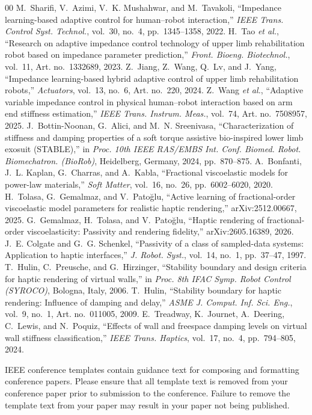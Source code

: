 ﻿\documentclass[conference]{IEEEtran}
\begin{document}
\begin{thebibliography}{00}
M.~Sharifi, V.~Azimi, V.~K. Mushahwar, and M.~Tavakoli, ``Impedance
learning-based adaptive control for human--robot interaction,'' \emph{IEEE
Trans. Control Syst. Technol.}, vol.~30, no.~4, pp.~1345--1358, 2022.
H.~Tao \emph{et al.}, ``Research on adaptive impedance control technology of
upper limb rehabilitation robot based on impedance parameter prediction,''
\emph{Front. Bioeng. Biotechnol.}, vol.~11, Art. no.~1332689, 2023.
Z.~Jiang, Z.~Wang, Q.~Lv, and J.~Yang, ``Impedance learning-based hybrid
adaptive control of upper limb rehabilitation robots,'' \emph{Actuators},
vol.~13, no.~6, Art. no.~220, 2024.
Z.~Wang \emph{et al.}, ``Adaptive variable impedance control in physical
human--robot interaction based on arm end stiffness estimation,'' \emph{IEEE
Trans. Instrum. Meas.}, vol.~74, Art. no.~7508957, 2025.
J.~Bottin-Noonan, G.~Alici, and M.~N. Sreenivasa, ``Characterization of
stiffness and damping properties of a soft torque assistive bio-inspired
lower limb exosuit (STABLE),'' in \emph{Proc. 10th IEEE RAS/EMBS Int. Conf.
Biomed. Robot. Biomechatron. (BioRob)}, Heidelberg, Germany, 2024,
pp.~870--875.
A.~Bonfanti, J.~L. Kaplan, G.~Charras, and A.~Kabla, ``Fractional viscoelastic
models for power-law materials,'' \emph{Soft Matter}, vol.~16, no.~26,
pp.~6002--6020, 2020.
H.~Tolasa, G.~Gemalmaz, and V.~Pato\u{g}lu, ``Active learning of
fractional-order viscoelastic model parameters for realistic haptic
rendering,'' arXiv:2512.00667, 2025.
G.~Gemalmaz, H.~Tolasa, and V.~Pato\u{g}lu, ``Haptic rendering of
fractional-order viscoelasticity: Passivity and rendering fidelity,''
arXiv:2605.16389, 2026.
J.~E. Colgate and G.~G. Schenkel, ``Passivity of a class of sampled-data
systems: Application to haptic interfaces,'' \emph{J. Robot. Syst.},
vol.~14, no.~1, pp.~37--47, 1997.
T.~Hulin, C.~Preusche, and G.~Hirzinger, ``Stability boundary and design
criteria for haptic rendering of virtual walls,'' in \emph{Proc. 8th IFAC
Symp. Robot Control (SYROCO)}, Bologna, Italy, 2006.
T.~Hulin, ``Stability boundary for haptic rendering: Influence of damping
and delay,'' \emph{ASME J. Comput. Inf. Sci. Eng.}, vol.~9, no.~1, Art.
no.~011005, 2009.
E.~Treadway, K.~Journet, A.~Deering, C.~Lewis, and N.~Poquiz, ``Effects of
wall and freespace damping levels on virtual wall stiffness classification,''
\emph{IEEE Trans. Haptics}, vol.~17, no.~4, pp.~794--805, 2024.
\end{thebibliography}
\vspace{12pt}
\color{red}
IEEE conference templates contain guidance text for composing and formatting conference papers. Please ensure that all template text is removed from your conference paper prior to submission to the conference. Failure to remove the template text from your paper may result in your paper not being published.
\end{document}
